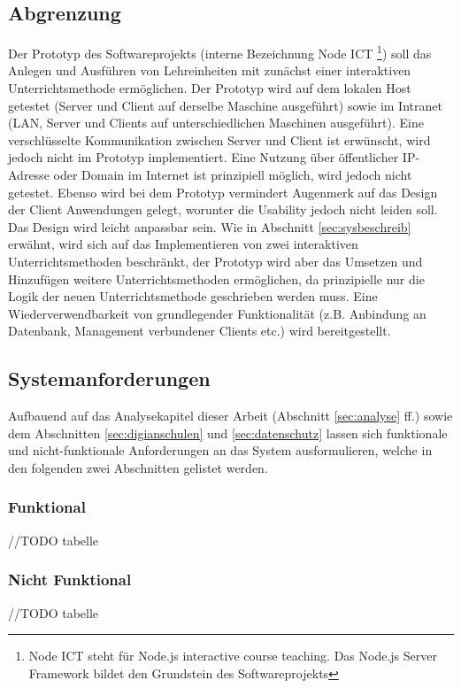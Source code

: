 \subsection{Abgrenzung}\label{sec:abgrenz}
Der Prototyp des Softwareprojekts (interne Bezeichnung Node ICT \footnote{Node ICT steht für Node.js interactive course teaching. Das Node.js Server Framework bildet den Grundstein des Softwareprojekts}) soll das Anlegen und Ausführen von Lehreinheiten mit zunächst einer interaktiven Unterrichtsmethode ermöglichen. Der Prototyp wird auf dem lokalen Host getestet (Server und Client auf derselbe Maschine ausgeführt) sowie im Intranet (LAN, Server und Clients auf unterschiedlichen Maschinen ausgeführt). Eine verschlüsselte Kommunikation zwischen Server und Client ist erwünscht, wird jedoch nicht im Prototyp implementiert. Eine Nutzung über öffentlicher IP-Adresse oder Domain im Internet ist prinzipiell möglich, wird jedoch nicht getestet. Ebenso wird bei dem Prototyp vermindert Augenmerk auf das Design der Client Anwendungen gelegt, worunter die Usability jedoch nicht leiden soll. Das Design wird leicht anpassbar sein. Wie in Abschnitt \ref{sec:sysbeschreib} erwähnt, wird sich auf das Implementieren von zwei interaktiven Unterrichtsmethoden beschränkt, der Prototyp wird aber das Umsetzen und Hinzufügen weitere Unterrichtsmethoden ermöglichen, da prinzipielle nur die Logik der neuen Unterrichtsmethode geschrieben werden muss. Eine Wiederverwendbarkeit von grundlegender Funktionalität (z.B. Anbindung an Datenbank, Management verbundener Clients etc.) wird bereitgestellt.   
\subsection{Systemanforderungen}\label{sec:anforderung}
Aufbauend auf das Analysekapitel dieser Arbeit (Abschnitt \ref{sec:analyse} ff.) sowie dem Abschnitten \ref{sec:digianschulen} und \ref{sec:datenschutz} lassen sich funktionale und nicht-funktionale Anforderungen an das System ausformulieren, welche in den folgenden zwei Abschnitten gelistet werden.

\subsubsection{Funktional}\label{sec:anffunc}
//TODO tabelle
\subsubsection{Nicht Funktional}\label{sec:nichtfunc}
//TODO tabelle

